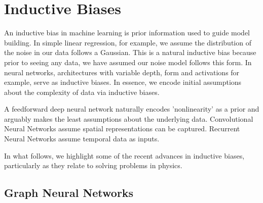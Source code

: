 \documentclass{article}
\begin{document}
\section{Inductive Biases}

An inductive bias in machine learning is prior information used to guide model building. In simple linear regression, for example, we assume the distribution of the noise in our data follows a Gaussian. This is a natural inductive bias because prior to seeing any data, we have assumed our noise model follows this form. In neural networks, architectures with variable depth, form and activations for example, serve as inductive biases. In essence, we encode initial assumptions about the complexity of data via inductive biases. 

A feedforward deep neural network naturally encodes 'nonlinearity' as a prior and arguably makes the least assumptions about the underlying data. Convolutional Neural Networks assume spatial representations can be captured. Recurrent Neural Networks assume temporal data as inputs. 

In what follows, we highlight some of the recent advances in inductive biases, particularly as they relate to solving problems in physics.

\subsection{Graph Neural Networks}
\end{document}
